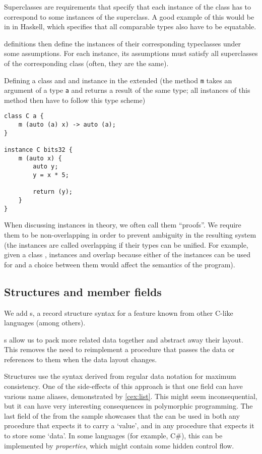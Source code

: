 Superclasses are requirements that specify that each instance of the class has to correspond to some instances of the superclass. A good example of this would be  in  in Haskell, which specifies that all comparable types also have to be equatable.

 definitions then define the instances of their corresponding typeclasses under some assumptions. For each instance, its assumptions must satisfy all superclasses of the corresponding class (often, they are the same).

\begin{codex}
    \caption{Defining a class and and instance in the extended \cmm (the method \texttt{m} takes an argument of a type \texttt{a} and returns a result of the same type; all instances of this method then have to follow this type scheme)}
    \label{cex:classInstance}
    \begin{lstlisting}
class C a {
    m (auto (a) x) -> auto (a);
}

instance C bits32 {
    m (auto x) {
        auto y;
        y = x * 5;

        return (y);
    }
}
    \end{lstlisting}
\end{codex}

When discussing instances in theory, we often call them ``proofs''. We require them to be non-overlapping in order to prevent ambiguity in the resulting system (the instances are called overlapping if their types can be unified. For example, given a class , instances  and  overlap because either of the instances can be used for  and a choice between them would affect the semantics of the program).

\subsection{Structures and member fields}
\label{sec:structExt}

We add s, a record structure syntax for a feature known from other C-like languages (among others).

s allow us to pack more related data together and abstract away their layout. This removes the need to reimplement a procedure that passes the data or references to them when the data layout changes.

Structures use the syntax derived from regular data notation for maximum consistency. One of the side-effects of this approach is that one field can have various name aliases, demonstrated by \cref{cex:list}. This might seem inconsequential, but it can have very interesting consequences in polymorphic programming. The last field of the  from the sample showcases that the  can be used in both any procedure that expects it to carry a `value', and in any procedure that expects it to store some `data'. In some languages (for example, C\#), this can be implemented by \emph{properties}, which might contain some hidden control flow.

